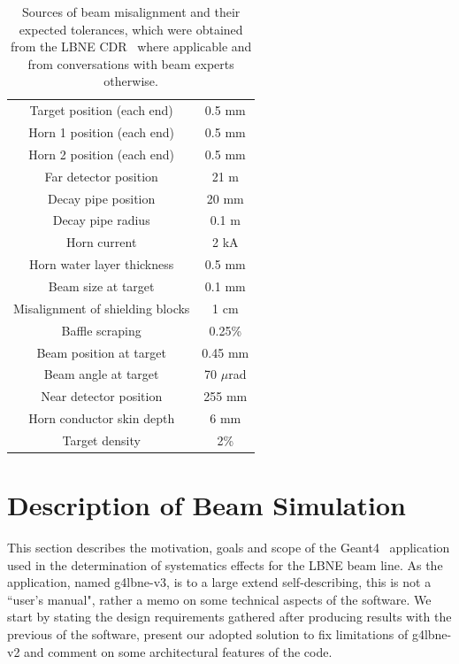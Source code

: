 \begin{table}[ht]
\centering
\begin{tabular}{ | c | c | }
\hline
  Target position (each end) & 0.5 mm \\
  Horn 1 position (each end) & 0.5 mm \\
  Horn 2 position (each end) & 0.5 mm \\
  Far detector position & 21 m \\
  Decay pipe position & 20 mm \\
  Decay pipe radius & 0.1 m \\
  Horn current & 2 kA \\
  Horn water layer thickness & 0.5 mm \\
  Beam size at target & 0.1 mm \\
  Misalignment of shielding blocks & 1 cm \\
  Baffle scraping & 0.25\% \\
  Beam position at target & 0.45 mm \\
  Beam angle at target & 70 $\mu$rad \\
  Near detector position & 255 mm \\
  Horn conductor skin depth & 6 mm \\
  Target density & 2\% \\ 
\hline
\end{tabular}
\caption{Sources of beam misalignment and their expected tolerances, which were obtained from the LBNE CDR~\cite{lbnecdr} where applicable and from conversations with beam experts otherwise.}
\label{tab:syslist}
\end{table}

\section{Description of Beam Simulation}
\label{sec:beamsim}

This section describes the motivation, goals and scope of the Geant4~\cite{Geant4} application used in the determination of systematics effects for the LBNE   beam line. As the application, named g4lbne-v3, is to a large extend self-describing, this is not a ``user's manual", rather a memo on some technical   aspects of the software. We start by stating the design requirements gathered after producing results with the previous of the software, present   our adopted solution to fix limitations of g4lbne-v2 and comment on some architectural features of the code. 

